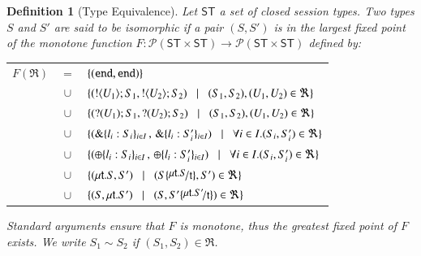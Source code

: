 \documentclass[preprint,11pt]{elsarticle}
\newtheorem{definition}{Definition}[section]
\begin{document}
\begin{definition}[Type Equivalence]
\label{def:iso}
Let $\mathsf{ST}$ a set of closed session types. 
Two types $S$ and $S'$ are said to be {\em isomorphic} if a pair $(S,S')$ is 
in the largest fixed point of the monotone function
$F:\mathcal{P}(\mathsf{ST}\times \mathsf{ST}) \to 
\mathcal{P}(\mathsf{ST}\times \mathsf{ST})$ defined by:

\hspace{-0.5cm}\begin{tabular}{rcl}
$F(\Re)$ &$\!\!=\!\!$&	$\{(\mathtt{end}, \mathtt{end})\}$\\
         &$\!\!\cup\!\!$&	$\{(! \langle U_1 \rangle ; S_1, ! \langle U_2 \rangle ; S_2)
\;\;\;|\;\;\; (S_1, S_2),(U_1, U_2)\in \Re\}$\\ 
       &$\!\!\cup\!\!$&	$\{(? (U_1) ; S_1, ? (U_2) ; S_2)
\;\;\;|\;\;\;(S_1, S_2),(U_1, U_2)\in \Re\}$\\ 
	&$\!\!\cup\!\!$&	$\{(\& \{l_i: S_i\}_{i \in I} \,,\, \& \{l_i: S_i'\}_{i \in I}) \;\;\;|\;\;\; \forall i\in I. (S_i, S_i')\in \Re\}$\\
	&$\!\!\cup\!\!$&	$\{(\oplus \{l_i: S_i\}_{i \in I}\,,\, \oplus \{l_i: S_i'\}_{i \in I}) \;\;\;|\;\;\; \forall i\in I. (S_i, S_i')\in \Re\}$\\
	&$\!\!\cup\!\!$&	$\set{(\trec{t}{S}, S')
\bnfbar (S\subst{\trec{t}{S}}{\vart{t}},S')\in \Re}$\\
	&$\!\!\cup\!\!$&	$\set{(S,\trec{t}{S'})
\bnfbar (S,S'\subst{\trec{t}{S'}}{\vart{t}})\in \Re}$
\end{tabular}
	
\noindent
Standard arguments ensure that $F$ is monotone, thus the greatest fixed point
of $F$ exists. We write $S_1 \sim S_2$ if  $(S_1,S_2)\in \Re$. 
\end{definition}

\smallskip 
\end{document}
